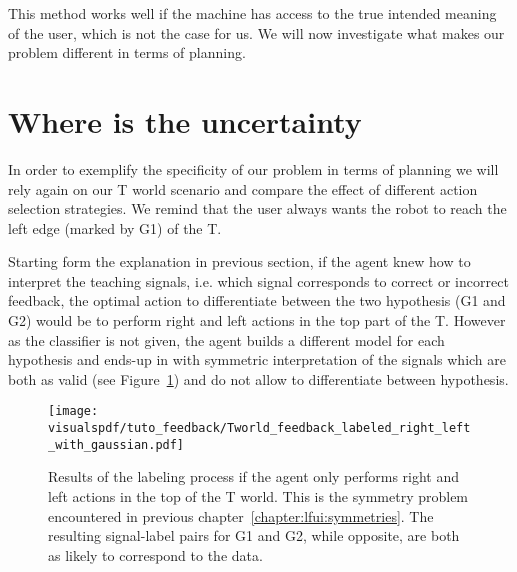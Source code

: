 

This method works well if the machine has access to the true intended meaning of the user, which is not the case for us. We will now investigate what makes our problem different in terms of planning.

\section{Where is the uncertainty}
\label{chapter:planning:where}


In order to exemplify the specificity of our problem in terms of planning we will rely again on our T world scenario and compare the effect of different action selection strategies. We remind that the user always wants the robot to reach the left edge (marked by G1) of the T.


Starting form the explanation in previous section, if the agent knew how to interpret the teaching signals, i.e. which signal corresponds to correct or incorrect feedback, the optimal action to differentiate between the two hypothesis (G1 and G2) would be to perform right and left actions in the top part of the T. However as the classifier is not given, the agent builds a different model for each hypothesis and ends-up in with symmetric interpretation of the signals which are both as valid (see Figure~\ref{fig:planningrightleft}) and do not allow to differentiate between hypothesis.

\begin{figure}[!ht]
  \centering
  \texttt{[image: \\visualspdf/tuto\_feedback/Tworld\_feedback\_labeled\_right\_left\_with\_gaussian.pdf]}
  \caption{Results of the labeling process if the agent only performs right and left actions in the top of the T world. This is the symmetry problem encountered in previous chapter~\ref{chapter:lfui:symmetries}. The resulting signal-label pairs for G1 and G2, while opposite, are both as likely to correspond to the data.}
  \label{fig:planningrightleft}
\end{figure}

